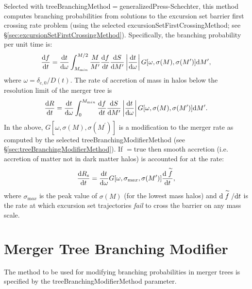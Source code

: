 Selected with {\normalfont \ttfamily treeBranchingMethod}$=${\normalfont \ttfamily generalizedPress-Schechter}, this method computes branching probabilities from solutions to the excursion set barrier first crossing rate problem (using the selected {\normalfont \ttfamily excursionSetFirstCrossingMethod}; see \S\ref{sec:excursionSetFirstCrossingMethod}). Specifically, the branching probability per unit time is:
\begin{equation}
 {\d f \over \d t} = {{\mathrm d} t \over {\mathrm d}\omega} \int_{M_{\mathrm min}}^{M/2} {M \over M^\prime} {\d f \over \d t} {\d S \over \d M^\prime} \left| {\d t \over \d \omega}\right| G[\omega,\sigma(M),\sigma(M^\prime)] \d M^\prime,
\end{equation}
where $\omega = \delta_{\mathrm c,0}/D(t)$. The rate of accretion of mass in halos below the resolution limit of the merger tree is
\begin{equation}
 {\d R \over \d t} =  {{\mathrm d} t \over {\mathrm d}\omega} \int_0^{M_{\mathrm min}} {\d f \over \d t} {\d S \over \d M^\prime} \left| {\d t \over \d \omega}\right| G[\omega,\sigma(M),\sigma(M^\prime)] \d M^\prime.
\end{equation}
In the above, $G[\omega,\sigma(M),\sigma(M^\prime)]$ is a modification to the merger rate as computed by the selected {\normalfont \ttfamily treeBranchingModifierMethod} (see \S\ref{sec:treeBranchingModifierMethod}). If {\normalfont \ttfamily [generalizedPressSchechterSmoothAccretion]}$=${\normalfont \ttfamily true} then smooth accretion (i.e. accretion of matter not in dark matter halos) is accounted for at the rate:
\begin{equation}
 {\d R_{\mathrm s} \over \d t} =  {{\mathrm d} t \over {\mathrm d}\omega} G[\omega,\sigma_{\mathrm max},\sigma(M^\prime)] {\d \stackrel{\sim}{f} \over \d t},
\end{equation}
where $\sigma_{\mathrm max}$ is the peak value of $\sigma(M)$ (for the lowest mass halos) and $\d \stackrel{\sim}{f}/\d t$ is the rate at which excursion set trajectories \emph{fail} to cross the barrier on any mass scale.


\section{Merger Tree Branching Modifier}

The method to be used for modifying branching probabilities in merger trees is specified by the {\normalfont \ttfamily treeBranchingModifierMethod} parameter.


